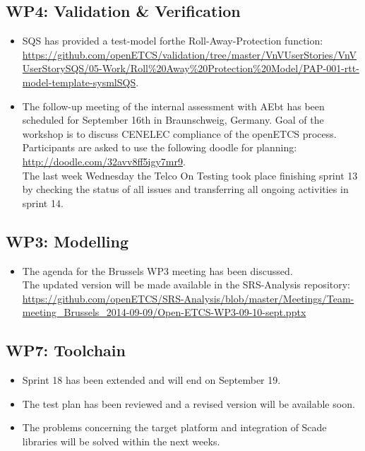 \documentclass[a4paper, 11pt]{article}
\begin{document}
\subsection{WP4: Validation \& Verification}
\begin{itemize}
\item SQS has provided a test-model forthe Roll-Away-Protection function: \url{https://github.com/openETCS/validation/tree/master/VnVUserStories/VnVUserStorySQS/05-Work/Roll%20Away%20Protection%20Model/PAP-001-rtt-model-template-sysmlSQS}.
\item The follow-up meeting of the internal assessment with AEbt has been scheduled for September 16th in Braunschweig, Germany. Goal of the workshop is to discuss CENELEC compliance of the openETCS process. Participants are asked to use the following doodle for planning: \url{http://doodle.com/32avv8ff5igy7mr9}.\\
The last week Wednesday the Telco On Testing took place finishing sprint 13 by checking the status of all issues and transferring all ongoing activities in sprint 14.

\end{itemize}

\subsection{WP3: Modelling}
\begin{itemize}
\item The agenda for the Brussels WP3 meeting has been discussed.\\
The updated version will be made available in the SRS-Analysis repository: \url{https://github.com/openETCS/SRS-Analysis/blob/master/Meetings/Team-meeting_Brussels_2014-09-09/Open-ETCS-WP3-09-10-sept.pptx}
\end{itemize}

\subsection{WP7: Toolchain}

\begin{itemize}
\item Sprint 18 has been extended and will end on September 19.
\item The test plan has been reviewed and a revised version will be available soon.
\item The problems concerning the target platform and integration of Scade libraries will be solved within the next weeks.
\end{itemize}
\end{document}
